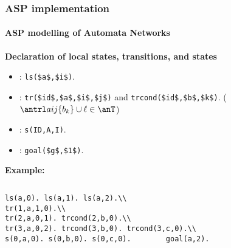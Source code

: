 \begin{frame}[c]
 \frametitle{ASP implementation}
 \framesubtitle{ASP modelling of Automata Networks}
 
\textbf{Declaration of local states, transitions, and states}
\begin{itemize}
\item {} : \lstinline|ls($a$,$i$)|.
\item {} : \lstinline|tr($id$,$a$,$i$,$j$)| and \lstinline|trcond($id$,$b$,$k$)|. 
($\antrl aij{\{b_k\}\cup\ell}\in\anT$)
\item {} : \lstinline|s(ID,A,I)|.
\item {} : \lstinline|goal($g$,$1$)|.
\end{itemize}


\textbf{Example:}
\begin{columns}
\begin{column}{0.5\textwidth}
\begin{lstlisting}
ls(a,0). ls(a,1). ls(a,2).\\
tr(1,a,1,0).\\
tr(2,a,0,1). trcond(2,b,0).\\
tr(3,a,0,2). trcond(3,b,0). trcond(3,c,0).\\
s(0,a,0). s(0,b,0). s(0,c,0).        goal(a,2).
\end{lstlisting}
\end{column}
\begin{column}{0.5\textwidth}
\begin{center}\scalebox{\scaleex}{
\begin{tikzpicture}
\exanaspdef
\end{tikzpicture}
}\end{center}
\end{column}
\end{columns}
\end{frame}

